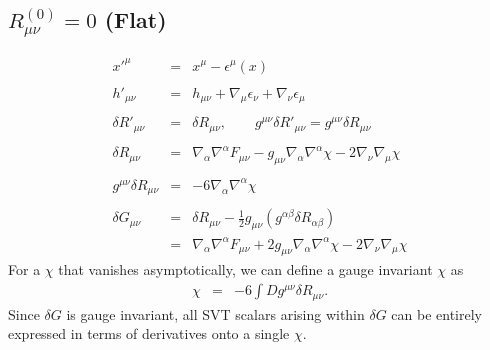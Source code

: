 \documentclass[10pt,letterpaper]{article}
\numberwithin{equation}{section}
\begin{document}
\begin{appendices}
\subsection{$R^{(0)}_{\mu\nu}=0$ (Flat)}
%
\begin{eqnarray}
x'^\mu &=& x^\mu - \epsilon^\mu(x)
\\ \nonumber\\
h'_{\mu\nu} &=&  h_{\mu\nu} + \nabla_\mu\epsilon_\nu + \nabla_\nu \epsilon_\mu 
\\ \nonumber\\
\delta R'_{\mu\nu} &=& \delta R_{\mu\nu},\qquad 
g^{\mu\nu}\delta R'_{\mu\nu} = g^{\mu\nu} \delta R_{\mu\nu}
\\ \nonumber\\
\delta R_{\mu\nu} &=& \nabla_{\alpha }\nabla^{\alpha }F_{\mu \nu } -  g_{\mu \nu } \nabla_{\alpha }\nabla^{\alpha }\chi - 2 \nabla_{\nu }\nabla_{\mu }\chi 
\\ \nonumber\\
g^{\mu\nu}\delta R_{\mu\nu} &=& -6\nabla_\alpha \nabla^\alpha \chi
\\ \nonumber\\
\delta G_{\mu\nu} &=& \delta R_{\mu\nu} -\frac12 g_{\mu\nu}(g^{\alpha\beta} \delta R_{\alpha\beta})
\nonumber\\
&=& \nabla_{\alpha }\nabla^{\alpha }F_{\mu \nu } + 2 g_{\mu \nu } \nabla_{\alpha }\nabla^{\alpha }\chi - 2 \nabla_{\nu }\nabla_{\mu }\chi
\end{eqnarray}
For a $\chi$ that vanishes asymptotically, we can define a gauge invariant $\chi$ as
\begin{eqnarray}
\chi &=& -6\int D g^{\mu\nu}\delta R_{\mu\nu}.
\end{eqnarray}
Since $\delta G$ is gauge invariant, all SVT scalars arising within $\delta G$ can be entirely expressed in terms of derivatives onto a single $\chi$. 


\end{appendices}
\end{document}
